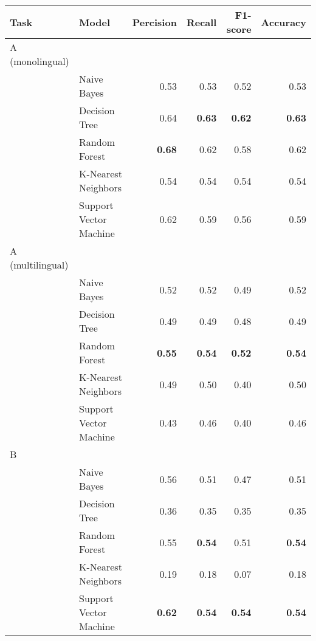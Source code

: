 \documentclass[11pt, convert]{standalone}
\begin{document}
\begin{tabular}{llrrrr}
	\toprule
	Task             & Model                  & Percision     & Recall        & F1-score      & Accuracy      \\
	\midrule
	A (monolingual)  &                        &               &               &               &               \\
									 & Naive Bayes            & 0.53          & 0.53          & 0.52          & 0.53          \\
									 & Decision Tree          & 0.64          & \textbf{0.63} & \textbf{0.62} & \textbf{0.63} \\
									 & Random Forest          & \textbf{0.68} & 0.62          & 0.58          & 0.62          \\
									 & K-Nearest Neighbors    & 0.54          & 0.54          & 0.54          & 0.54          \\
									 & Support Vector Machine & 0.62          & 0.59          & 0.56          & 0.59          \\
	\midrule
	A (multilingual) &                        &               &               &               &               \\
									 & Naive Bayes            & 0.52          & 0.52          & 0.49          & 0.52          \\
									 & Decision Tree          & 0.49          & 0.49          & 0.48          & 0.49          \\
									 & Random Forest          & \textbf{0.55} & \textbf{0.54} & \textbf{0.52} & \textbf{0.54} \\
									 & K-Nearest Neighbors    & 0.49          & 0.50          & 0.40          & 0.50          \\
									 & Support Vector Machine & 0.43          & 0.46          & 0.40          & 0.46          \\
	\midrule
	B                &                        &               &               &               &               \\
									 & Naive Bayes            & 0.56          & 0.51          & 0.47          & 0.51          \\
									 & Decision Tree          & 0.36          & 0.35          & 0.35          & 0.35          \\
									 & Random Forest          & 0.55          & \textbf{0.54} & 0.51          & \textbf{0.54} \\
									 & K-Nearest Neighbors    & 0.19          & 0.18          & 0.07          & 0.18          \\
									 & Support Vector Machine & \textbf{0.62} & \textbf{0.54} & \textbf{0.54} & \textbf{0.54} \\
	\bottomrule
\end{tabular}
\end{document}
